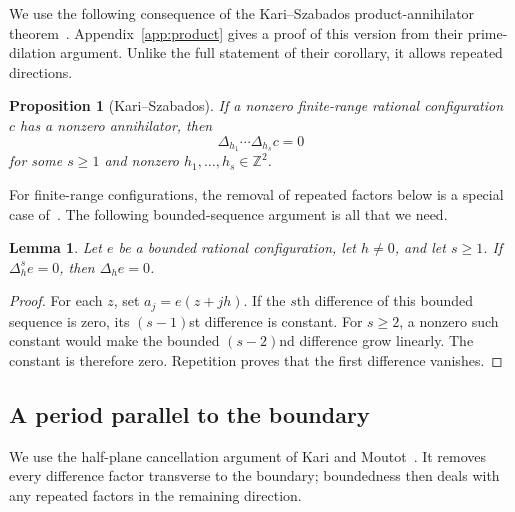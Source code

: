 \documentclass[11pt,a4paper,reqno]{amsart}
\newtheorem{proposition}[theorem]{Proposition}
\newtheorem{lemma}[theorem]{Lemma}
\theoremstyle{remark}
\newcommand{\Z}{\mathbb Z}
\newcommand{\De}{\Delta}
\numberwithin{equation}{section}
\begin{document}
We use the following consequence of the Kari--Szabados product-annihilator theorem~\cite[Theorem~11 and Corollary~12]{KS}. Appendix~\ref{app:product} gives a proof of this version from their prime-dilation argument. Unlike the full statement of their corollary, it allows repeated directions.

\begin{proposition}[Kari--Szabados]\label{prop:product}
If a nonzero finite-range rational configuration $c$ has a nonzero annihilator, then
\begin{equation}\label{eq:product-ann}
 \De_{h_1}\cdots\De_{h_s}c=0
\end{equation}
for some $s\ge1$ and nonzero $h_1,\ldots,h_s\in\Z^2$.
\end{proposition}

For finite-range configurations, the removal of repeated factors below is a special case of~\cite[Lemmas~9--10]{KS}. The following bounded-sequence argument is all that we need.

\begin{lemma}\label{lem:repeated}
Let $e$ be a bounded rational configuration, let $h\ne0$, and let $s\ge1$. If $\De_h^s e=0$, then $\De_h e=0$.
\end{lemma}
\begin{proof}
For each $z$, set $a_j=e(z+jh)$. If the $s$th difference of this bounded sequence is zero, its $(s-1)$st difference is constant. For $s\ge2$, a nonzero such constant would make the bounded $(s-2)$nd difference grow linearly. The constant is therefore zero. Repetition proves that the first difference vanishes.
\end{proof}

\subsection{A period parallel to the boundary}
We use the half-plane cancellation argument of Kari and Moutot~\cite[Proposition~13 and the proof of Lemma~17]{KM}. It removes every difference factor transverse to the boundary; boundedness then deals with any repeated factors in the remaining direction.
\end{document}
